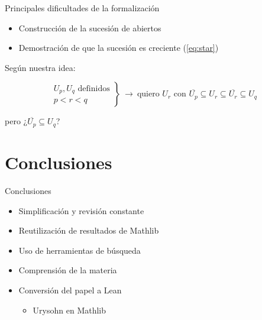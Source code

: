 \documentclass{beamer}
\begin{document}
\begin{frame}{Principales dificultades de la formalización}
  
  \begin{itemize}
    \item Construcción de la sucesión de abiertos
    \item Demostración de que la sucesión es creciente (\ref{eq:star})
  \end{itemize}

  \hspace{1cm}

  Según nuestra idea:

  $$
    \left.
    \begin{array}{l}
    U_p, U_q \text{ definidos} \\
    p < r < q
    \end{array}
    \right\}
    ~ \longrightarrow ~
    \text{quiero } U_r \text{ con } \overline{U_p} \subseteq U_r \subseteq \overline{U_r} \subseteq U_q
  $$

  pero ¿$\overline{U_p} \subseteq U_q$?

  \hspace{1cm}

  

\end{frame}

\section{Conclusiones}

\begin{frame}{Conclusiones}
  
  \begin{itemize}
    \item Simplificación y revisión constante
    \item Reutilización de resultados de Mathlib
    \item Uso de herramientas de búsqueda
    \item Comprensión de la materia
    \item Conversión del papel a Lean
    \begin{itemize}
      \item Urysohn en Mathlib
    \end{itemize}
  \end{itemize}

\end{frame}
\end{document}
